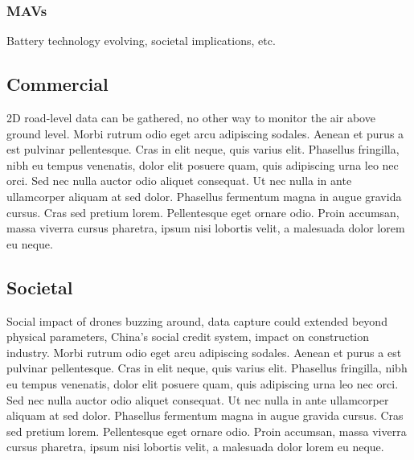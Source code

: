 
\subsubsection{MAVs}
Battery technology evolving, societal implications, etc.


\subsection{Commercial}

2D road-level data can be gathered, no other way to monitor the air above ground level. Morbi rutrum odio eget arcu adipiscing sodales. Aenean et purus a est pulvinar pellentesque. Cras in elit neque, quis varius elit. Phasellus fringilla, nibh eu tempus venenatis, dolor elit posuere quam, quis adipiscing urna leo nec orci. Sed nec nulla auctor odio aliquet consequat. Ut nec nulla in ante ullamcorper aliquam at sed dolor. Phasellus fermentum magna in augue gravida cursus. Cras sed pretium lorem. Pellentesque eget ornare odio. Proin accumsan, massa viverra cursus pharetra, ipsum nisi lobortis velit, a malesuada dolor lorem eu neque.


\subsection{Societal}

Social impact of drones buzzing around, data capture could extended beyond physical parameters, China’s social credit system, impact on construction industry. Morbi rutrum odio eget arcu adipiscing sodales. Aenean et purus a est pulvinar pellentesque. Cras in elit neque, quis varius elit. Phasellus fringilla, nibh eu tempus venenatis, dolor elit posuere quam, quis adipiscing urna leo nec orci. Sed nec nulla auctor odio aliquet consequat. Ut nec nulla in ante ullamcorper aliquam at sed dolor. Phasellus fermentum magna in augue gravida cursus. Cras sed pretium lorem. Pellentesque eget ornare odio. Proin accumsan, massa viverra cursus pharetra, ipsum nisi lobortis velit, a malesuada dolor lorem eu neque.


